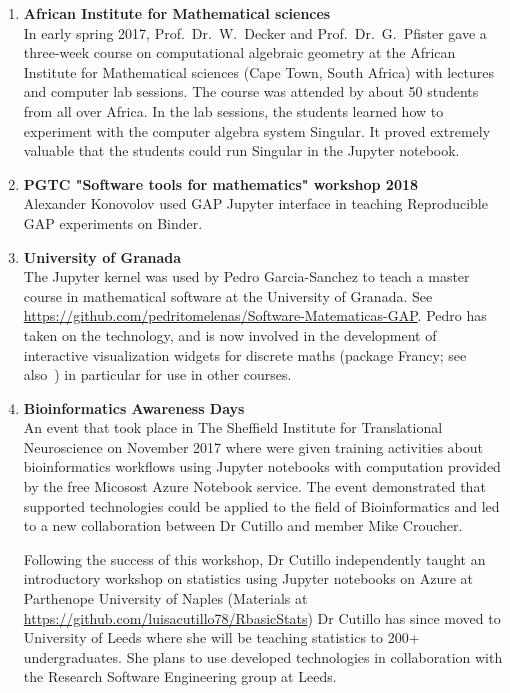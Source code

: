 \begin{enumerate}
\item \textbf{African Institute for Mathematical sciences}\\
  In early spring 2017, Prof.~Dr.~W.~Decker and Prof.~Dr.~G.~Pfister
  gave a three-week course on computational algebraic geometry at the
  African Institute for Mathematical sciences (Cape Town, South
  Africa) with lectures and computer lab sessions. The course was
  attended by about 50 students from all over Africa. In the lab
  sessions, the students learned how to experiment with the computer
  algebra system Singular. It proved extremely valuable that the
  students could run Singular in the Jupyter notebook.

\item \textbf{PGTC "Software tools for mathematics" workshop 2018}\\
  Alexander Konovolov used GAP Jupyter interface in teaching
  Reproducible GAP experiments on Binder.

\item \textbf{University of Granada}\\
  The \GAP Jupyter kernel was used by Pedro Garcia-Sanchez to teach a
  master course in mathematical software at the University of Granada.
  See
  \url{https://github.com/pedritomelenas/Software-Matematicas-GAP}.
  Pedro has taken on the technology, and is now involved in the
  development of interactive visualization widgets for discrete maths
  (package Francy; see
  also~) in particular
  for use in other courses.

\item \textbf{ Bioinformatics Awareness Days}\\
An event that took place in The Sheffield Institute for Translational Neuroscience on November 2017 where were given training activities
about bioinformatics workflows using Jupyter notebooks with
computation provided by the free Micosost Azure Notebook service. The event
demonstrated that \ODK supported technologies could be applied to the field of Bioinformatics and led to a new collaboration between Dr
Cutillo and \ODK member Mike Croucher.

Following the success of this workshop, Dr Cutillo independently taught an introductory workshop on statistics using Jupyter notebooks
on Azure at Parthenope University of Naples (Materials at \url{https://github.com/luisacutillo78/RbasicStats}) Dr Cutillo has since moved
to University of Leeds where she will be teaching statistics to 200+ undergraduates. She plans to use \ODK developed technologies
in collaboration with the Research Software Engineering group at Leeds.


\end{enumerate}
